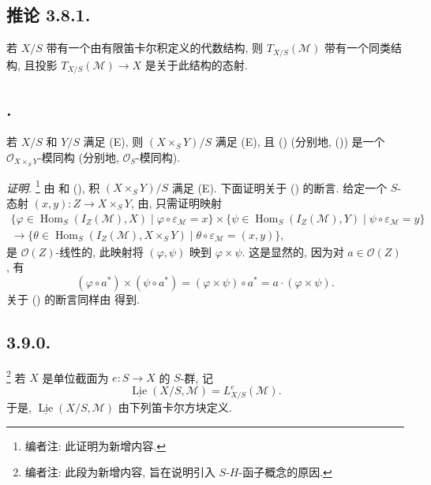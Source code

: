 \subsection*{推论 3.8.1.}
若 \(X/S\) 带有一个由有限笛卡尔积定义的代数结构, 则
\(T_{X/S}(\mathcal M)\) 带有一个同类结构,
且投影 \(T_{X/S}(\mathcal M)\to X\) 是关于此结构的态射.

\subsection*{.}
若 \(X/S\) 和 \(Y/S\) 满足 (E), 则 \((X\times_SY)/S\)
满足 (E), 且 ()
(分别地, ())
是一个 \(\mathcal O_{X\times_SY}\)-模同构
(分别地, \(\mathcal O_S\)-模同构).

\emph{证明.}
\footnote{编者注: 此证明为新增内容.}
由  和
(),
积 \((X\times_SY)/S\) 满足 (E).
下面证明关于 () 的断言.
给定一个 \(S\)-态射 \((x,y):Z\to X\times_SY\),
由, 只需证明映射
\begin{multline*}
  \{\varphi\in\operatorname{Hom}_S(I_Z(\mathcal M),X)
       \mid\varphi\circ\varepsilon_{\mathcal M}=x\}
  \times
  \{\psi\in\operatorname{Hom}_S(I_Z(\mathcal M),Y)
       \mid\psi\circ\varepsilon_{\mathcal M}=y\}\\
  \longrightarrow
  \{\theta\in\operatorname{Hom}_S(I_Z(\mathcal M),X\times_SY)
       \mid\theta\circ\varepsilon_{\mathcal M}=(x,y)\},
\end{multline*}
是 \(\mathcal O(Z)\)-线性的, 此映射将 \((\varphi,\psi)\)
映到 \(\varphi\times\psi\). 这是显然的,
因为对 \(a\in\mathcal O(Z)\), 有
\[
  (\varphi\circ a^*)\times(\psi\circ a^*)
  =(\varphi\times\psi)\circ a^*
  =a\cdot(\varphi\times\psi).
\]
关于 ()
的断言同样由  得到.

\subsection*{3.9.0.}
\footnote{编者注: 此段为新增内容, 旨在说明引入
\(S\)-\(H\)-函子概念的原因.}
若 \(X\) 是单位截面为 \(e:S\to X\) 的 \(S\)-群, 记
\[
  \underline{\operatorname{Lie}}(X/S,\mathcal M)
  =L^e_{X/S}(\mathcal M).
\]
于是, \(\underline{\operatorname{Lie}}(X/S,\mathcal M)\)
由下列笛卡尔方块定义.

